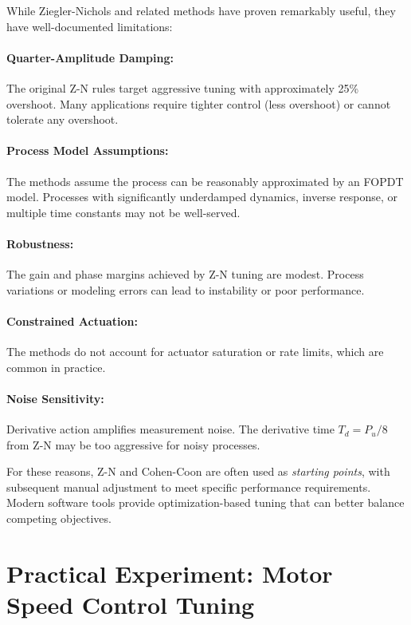 While Ziegler-Nichols and related methods have proven remarkably useful, they have well-documented limitations:

\paragraph{Quarter-Amplitude Damping:} The original Z-N rules target aggressive tuning with approximately 25\% overshoot. Many applications require tighter control (less overshoot) or cannot tolerate any overshoot.

\paragraph{Process Model Assumptions:} The methods assume the process can be reasonably approximated by an FOPDT model. Processes with significantly underdamped dynamics, inverse response, or multiple time constants may not be well-served.

\paragraph{Robustness:} The gain and phase margins achieved by Z-N tuning are modest. Process variations or modeling errors can lead to instability or poor performance.

\paragraph{Constrained Actuation:} The methods do not account for actuator saturation or rate limits, which are common in practice.

\paragraph{Noise Sensitivity:} Derivative action amplifies measurement noise. The derivative time $T_d = P_u/8$ from Z-N may be too aggressive for noisy processes.

For these reasons, Z-N and Cohen-Coon are often used as \textit{starting points}, with subsequent manual adjustment to meet specific performance requirements. Modern software tools provide optimization-based tuning that can better balance competing objectives.


\section{Practical Experiment: Motor Speed Control Tuning}
\label{sec:pid_tuning_experiment}

